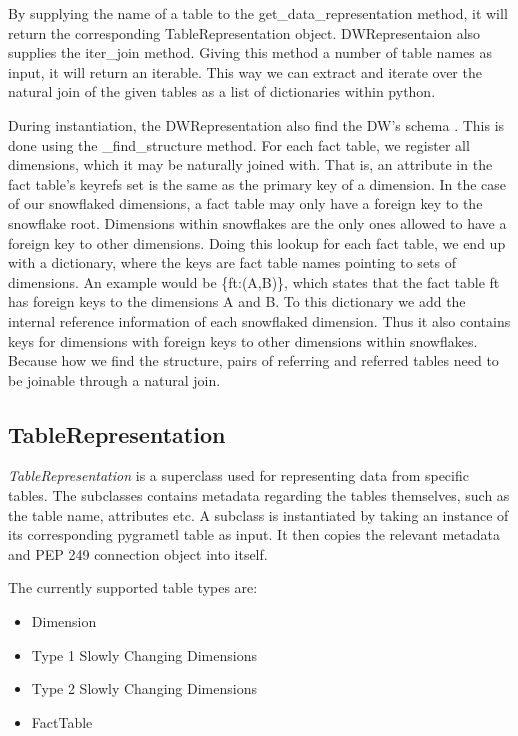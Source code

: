 By supplying the name of a table to the get\_data\_representation method, it will return the corresponding TableRepresentation object. DWRepresentaion also supplies the iter\_join method. Giving this method a number of table names as input, it will return an iterable. This way we can extract and  iterate over the natural join of the given tables as a list of dictionaries within python. 

During instantiation, the DWRepresentation also find the DW’s schema . This is done using the \_find\_structure method. For each fact table, we register all dimensions, which it may be naturally joined with. That is, an attribute in the fact table’s keyrefs set is the same as the primary key of a dimension. In the case of our snowflaked dimensions, a fact table may only have a foreign key to the snowflake root. Dimensions within snowflakes are the only ones allowed to have a foreign key to other dimensions. Doing this lookup for each fact table, we end up with a dictionary, where the keys are fact table names pointing to sets of dimensions. An example would be \{ft:(A,B)\}, which states that the fact table ft has foreign keys to the dimensions A and B. To this dictionary we add the internal reference information of each snowflaked dimension. Thus it also contains keys for dimensions with foreign keys to other dimensions within snowflakes. Because how we find the structure, pairs of referring and referred tables need to be joinable through a natural join. 

\subsection{TableRepresentation}
\textit{TableRepresentation} is a superclass used for representing data from specific tables. The subclasses contains metadata regarding the tables themselves, such as the table name, attributes etc. A subclass is instantiated by taking an instance of its corresponding pygrametl table as input. It then copies the relevant metadata and PEP 249 connection object into itself.

The currently supported table types are:

\begin{itemize}
\item Dimension
\item Type 1 Slowly Changing Dimensions
\item Type 2 Slowly Changing Dimensions
\item FactTable
\end{itemize}

